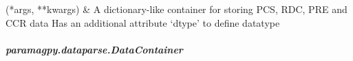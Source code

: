 \documentclass[a4paper,10pt,english,openany,oneside]{sphinxmanual}
\begin{document}
\begin{savenotes}\sphinxatlongtablestart\begin{longtable}{}
\hline

\endfirsthead

%
{}\\
\hline

\endhead

\hline
{}\\
\endfoot

\endlastfoot

{\hyperref[\detokenize{reference/generated/paramagpy.dataparse.DataContainer:paramagpy.dataparse.DataContainer}]{}}(*args, **kwargs)
&
A dictionary-like container for storing PCS, RDC, PRE and CCR data Has an additional attribute ‘dtype’ to define datatype
\\
\hline
\end{longtable}\sphinxatlongtableend\end{savenotes}


\subparagraph{paramagpy.dataparse.DataContainer}
\label{\detokenize{reference/generated/paramagpy.dataparse.DataContainer:paramagpy-dataparse-datacontainer}}\label{\detokenize{reference/generated/paramagpy.dataparse.DataContainer::doc}}
\end{document}
